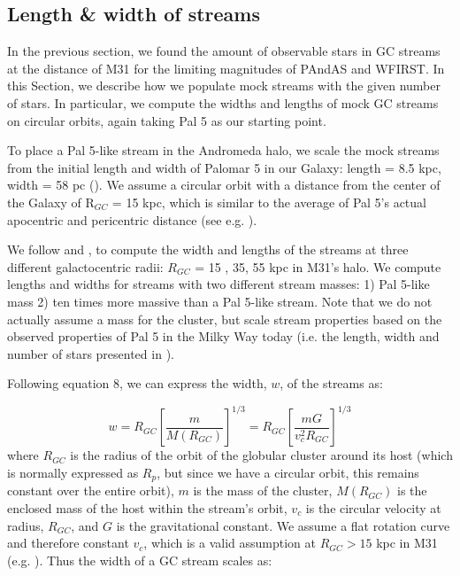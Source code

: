 \documentclass[twocolumn]{aastex62}
\begin{document}
\subsection{Length \& width of streams}
\label{sec:length}
In the previous section, we found the amount of observable stars in GC streams at the distance of M31 for the limiting magnitudes of PAndAS and WFIRST. In this Section, we describe how we populate mock streams with the given number of stars. In particular, we compute the widths and lengths of mock GC streams on circular orbits, again taking Pal 5 as our starting point. 

To place a Pal 5-like stream in the Andromeda halo, %
we scale the mock streams from the initial length and width of Palomar 5 in our Galaxy: length = 8.5 kpc, width = 58 pc (\citealt{ibata16}). We assume a circular orbit with a distance from the center of the Galaxy of R$_{GC}$ = 15 kpc, which is similar to the average of Pal 5's actual apocentric and pericentric distance (see e.g. \citealt{erkal17}). 

We follow \citet{johnston98} and \citet{johnston01}, to compute the width and lengths of the streams at three different galactocentric radii: $R_{GC}$ = 15 , 35, 55 kpc in M31's halo. We compute lengths and widths for streams with two different stream masses: 1) Pal 5-like mass 2) ten times more massive than a Pal 5-like stream. Note that we do not actually assume a mass for the cluster, but scale stream properties based on the observed properties of Pal 5 in the Milky Way today (i.e. the length, width and number of stars presented in \citealt{ibata16}).  

Following \citet{johnston01} equation 8, we can express the width, $w$, of the streams as:

\begin{equation}
w = R_{GC} \left[\frac{m}{M(R_{GC})}\right]^{1/3} = R_{GC} \left[\frac{m G}{v_c^2 R_{GC}}\right]^{1/3} 
\end{equation}
where $R_{GC}$ is the radius of the orbit of the globular cluster around its host (which is normally expressed as $R_p$, but since we have a circular orbit, this remains constant over the entire orbit), $m$ is the mass of the cluster, $M(R_{GC})$ is the enclosed mass of the host within the stream's orbit, $v_c$ is the circular velocity at radius, $R_{GC}$, and $G$ is the gravitational constant. We assume a flat rotation curve and therefore constant  $v_c$, which is a valid assumption at $R_{GC} > 15$ kpc in M31 (e.g. \citealt{chemin09}). Thus the width of a GC stream scales as:
\end{document}
